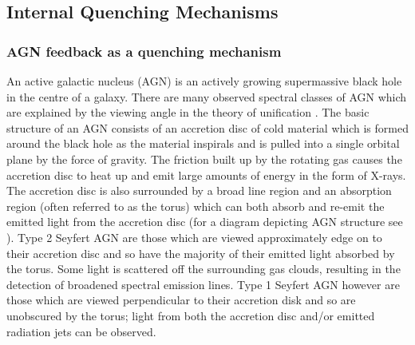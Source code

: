 \subsection{Internal Quenching Mechanisms}\label{sec:intquench}

\subsubsection{AGN feedback as a quenching mechanism}\label{sec:agnquench}

An active galactic nucleus (AGN) is an actively growing supermassive black hole in the centre of a galaxy. There are many observed spectral classes of AGN which are explained by the viewing angle in the theory of unification \citep[see review by][]{netzer15}. The basic structure of an AGN consists of an accretion disc of cold material which is formed around the black hole as the material inspirals and is pulled into a single orbital plane by the force of gravity. The friction built up by the rotating gas causes the accretion disc to heat up and emit large amounts of energy in the form of X-rays. The accretion disc is also surrounded by a broad line region and an absorption region (often referred to as the torus) which can both absorb and re-emit the emitted light from the accretion disc (for a diagram depicting AGN structure see \citealt{beckmann12}). Type 2 Seyfert AGN are those which are viewed approximately edge on to their accretion disc and so have the majority of their emitted light absorbed by the torus. Some light is scattered off the surrounding gas clouds, resulting in the detection of broadened spectral emission lines. Type 1 Seyfert AGN however are those which are viewed perpendicular to their accretion disk and so are unobscured by the torus; light from both the accretion disc and/or emitted radiation jets can be observed. 


